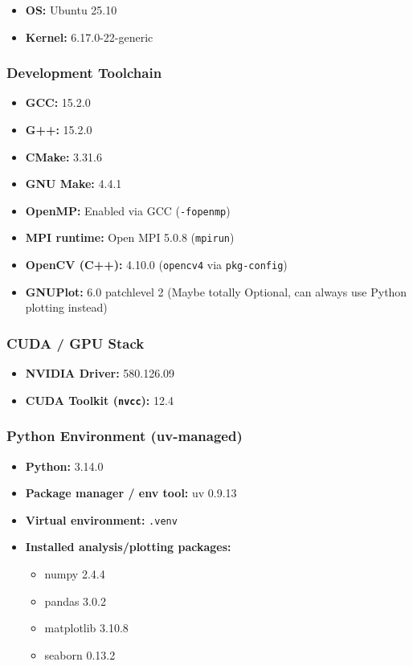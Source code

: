 \documentclass[
]{article}
\providecommand{\tightlist}{%
  \setlength{\itemsep}{0pt}\setlength{\parskip}{0pt}}
\begin{document}
\begin{itemize}
\tightlist
\item
  \textbf{OS:} Ubuntu 25.10
\item
  \textbf{Kernel:} 6.17.0-22-generic
\end{itemize}

\subsubsection{Development Toolchain}\label{development-toolchain}

\begin{itemize}
\tightlist
\item
  \textbf{GCC:} 15.2.0
\item
  \textbf{G++:} 15.2.0
\item
  \textbf{CMake:} 3.31.6
\item
  \textbf{GNU Make:} 4.4.1
\item
  \textbf{OpenMP:} Enabled via GCC (\texttt{-fopenmp})
\item
  \textbf{MPI runtime:} Open MPI 5.0.8 (\texttt{mpirun})
\item
  \textbf{OpenCV (C++):} 4.10.0 (\texttt{opencv4} via
  \texttt{pkg-config})
\item
  \textbf{GNUPlot:} 6.0 patchlevel 2 (Maybe totally Optional, can always
  use Python plotting instead)
\end{itemize}

\subsubsection{CUDA / GPU Stack}\label{cuda-gpu-stack}

\begin{itemize}
\tightlist
\item
  \textbf{NVIDIA Driver:} 580.126.09
\item
  \textbf{CUDA Toolkit (\texttt{nvcc}):} 12.4
\end{itemize}

\subsubsection{Python Environment
(uv-managed)}\label{python-environment-uv-managed}

\begin{itemize}
\tightlist
\item
  \textbf{Python:} 3.14.0
\item
  \textbf{Package manager / env tool:} uv 0.9.13
\item
  \textbf{Virtual environment:} \texttt{.venv}
\item
  \textbf{Installed analysis/plotting packages:}

  \begin{itemize}
  \tightlist
  \item
    numpy 2.4.4
  \item
    pandas 3.0.2
  \item
    matplotlib 3.10.8
  \item
    seaborn 0.13.2
  \end{itemize}
\end{itemize}
\end{document}
